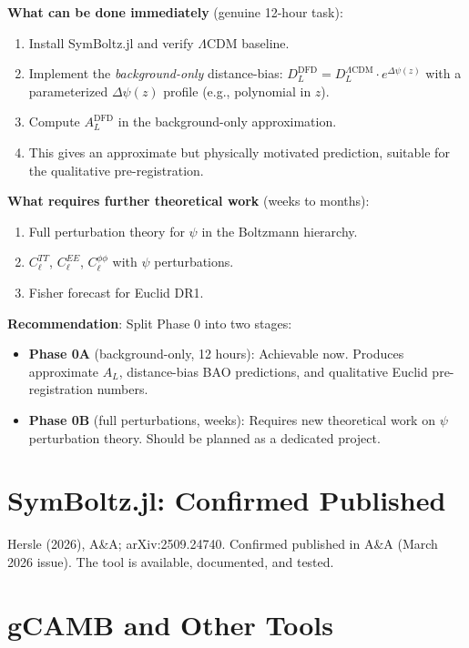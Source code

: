 \documentclass[11pt,a4paper]{article}
\begin{document}
\begin{tcolorbox}[colback=red!5!white, colframe=red!60!black,
  title={PHASE 0 HONEST RECKONING: Why It Has Not Happened}]
\textbf{What can be done immediately} (genuine 12-hour task):
\begin{enumerate}
\item Install SymBoltz.jl and verify $\Lambda$CDM baseline.
\item Implement the \emph{background-only} distance-bias: $D_L^{\text{DFD}} = D_L^{\Lambda\text{CDM}} \cdot e^{\Delta\psi(z)}$ with a parameterized $\Delta\psi(z)$ profile (e.g., polynomial in $z$).
\item Compute $A_L^{\text{DFD}}$ in the background-only approximation.
\item This gives an approximate but physically motivated prediction, suitable for the qualitative pre-registration.
\end{enumerate}

\textbf{What requires further theoretical work} (weeks to months):
\begin{enumerate}
\item Full perturbation theory for $\psi$ in the Boltzmann hierarchy.
\item $C_\ell^{TT}$, $C_\ell^{EE}$, $C_\ell^{\phi\phi}$ with $\psi$ perturbations.
\item Fisher forecast for Euclid DR1.
\end{enumerate}

\textbf{Recommendation}: Split Phase 0 into two stages:
\begin{itemize}
\item \textbf{Phase 0A} (background-only, 12 hours): Achievable now. Produces approximate $A_L$, distance-bias BAO predictions, and qualitative Euclid pre-registration numbers.
\item \textbf{Phase 0B} (full perturbations, weeks): Requires new theoretical work on $\psi$ perturbation theory. Should be planned as a dedicated project.
\end{itemize}
\end{tcolorbox}

\section{SymBoltz.jl: Confirmed Published}

Hersle (2026), A\&A; arXiv:2509.24740. Confirmed published in A\&A (March 2026 issue). The tool is available, documented, and tested.

\section{gCAMB and Other Tools}
\end{document}
